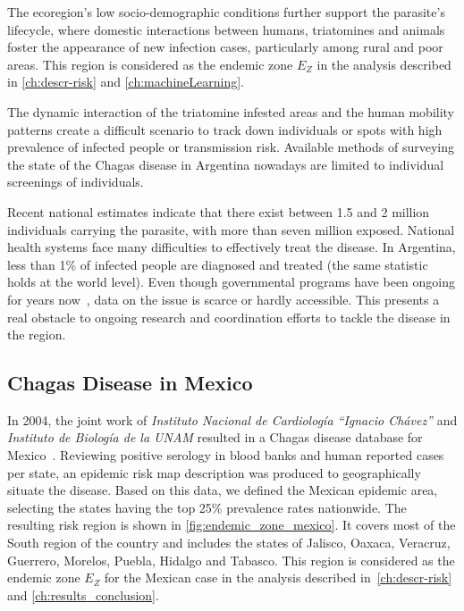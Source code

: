 The ecoregion's low socio-demographic conditions further support the parasite's lifecycle, where domestic interactions between humans, triatomines and animals foster the appearance of new infection cases, particularly among rural and poor areas.
This region is considered as the endemic zone $E_Z$ in the analysis described in \cref{ch:descr-risk} and \cref{ch:machineLearning}.




The dynamic interaction of the triatomine infested areas and the human mobility patterns create a difficult scenario to track down individuals or spots with high prevalence of infected people or transmission risk. Available methods of surveying the state of the Chagas disease in Argentina nowadays are limited to individual screenings of individuals. %

Recent national estimates indicate that there exist between 1.5 and 2 million individuals carrying the parasite, with more than seven million exposed. National health systems face many difficulties to effectively treat the disease.
In Argentina, less than 1\% of infected people are diagnosed and treated
(the same statistic holds at the world level).
Even though governmental programs have been ongoing for years now~\cite{plan_nacional_chagas}, data on the issue is scarce or hardly accessible. This presents a real obstacle to ongoing research and coordination efforts to tackle the disease in the region.


\subsection{Chagas Disease in  Mexico}\label{endemic_zone_mexico}



In 2004, the joint work of \textit{Instituto Nacional de Cardiología ``Ignacio Chávez''} and  \textit{Instituto de Biología de la UNAM} resulted in a Chagas disease database for Mexico~\cite{cruz2006chagmex}. Reviewing positive serology in blood banks and human reported cases per state, an epidemic risk map description was produced to geographically situate the disease. Based on this data, we defined the Mexican epidemic area, selecting the states having the top 25\% prevalence rates nationwide. The resulting risk region is shown in \cref{fig:endemic_zone_mexico}. It covers most of the South region of the country and includes the states of Jalisco, Oaxaca, Veracruz, Guerrero, Morelos, Puebla, Hidalgo and Tabasco.
This region is considered as the endemic zone $E_Z$ for the Mexican case in the analysis described in~\cref{ch:descr-risk} and \cref{ch:results_conclusion}.

